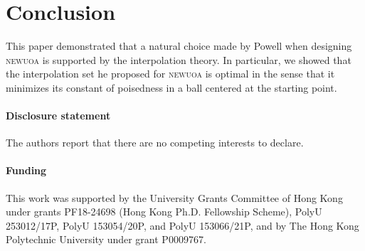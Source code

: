 \documentclass[draft]{article}
\numberwithin{equation}{section}
\theoremstyle{definition}
\theoremstyle{plain}
\theoremstyle{remark}
\newcommand*{\solvername}[1]{\textsc{#1}\xspace}
\begin{document}
\cite{Dodangeh_Vicente_Zhang_2016}


\section{Conclusion}

This paper demonstrated that a natural choice made by Powell when designing \solvername{newuoa} is supported by the interpolation theory.
In particular, we showed that the interpolation set he proposed for \solvername{newuoa} is optimal in the sense that it minimizes its constant of poisedness in a ball centered at the starting point.

\paragraph*{Disclosure statement}
The authors report that there are no competing interests to declare.

\paragraph*{Funding}
This work was supported by the University Grants Committee of Hong Kong under grants PF18-24698 (Hong Kong Ph.D. Fellowship Scheme), PolyU 253012/17P, PolyU 153054/20P, and PolyU 153066/21P, and by The Hong Kong Polytechnic University under grant P0009767.



\end{document}
